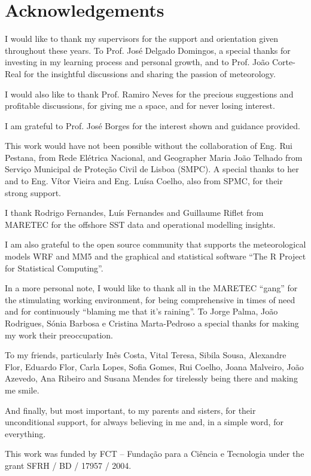 \chapter{Acknowledgements}\label{sec:agradec} 

I would like to thank my supervisors for the support and orientation given throughout these years. To Prof. José Delgado Domingos, a special thanks for investing in my learning process and personal growth, and to Prof. João Corte-Real for the insightful discussions and sharing the passion of meteorology.

I would also like to thank Prof. Ramiro Neves for the precious suggestions and profitable discussions, for giving me a space, and for never losing interest.

I am grateful to Prof. José Borges for the interest shown and guidance provided.

This work would have not been possible without the collaboration of Eng. Rui Pestana, from Rede Elétrica Nacional, and Geographer Maria João Telhado from Serviço Municipal de Proteção Civil de Lisboa (SMPC). A special thanks to her and to Eng. Vítor Vieira and Eng. Luísa Coelho, also from SPMC, for their strong support.

I thank Rodrigo Fernandes, Luís Fernandes and Guillaume Riflet from MARETEC for the offshore SST data and operational modelling insights.

I am also grateful to the open source community that supports the meteorological models WRF and MM5 and the graphical and statistical software “The R Project for Statistical Computing”.

In a more personal note, I would like to thank all in the MARETEC ``gang'' for the stimulating working environment, for being comprehensive in times of need and for continuously ``blaming me that it's raining''. To Jorge Palma, João Rodrigues, Sónia Barbosa e Cristina Marta-Pedroso a special thanks for making my work their preoccupation.

To my friends, particularly Inês Costa, Vital Teresa, Sibila Sousa, Alexandre Flor, Eduardo Flor, Carla Lopes, Sofia Gomes, Rui Coelho, Joana Malveiro, João Azevedo, Ana Ribeiro and Susana Mendes for tirelessly being there and making me smile.

And finally, but most important, to my parents and sisters, for their unconditional support, for always believing in me and, in a simple word, for everything.

This work was funded by FCT – Fundação para a Ciência e Tecnologia under the grant SFRH / BD / 17957 / 2004.
